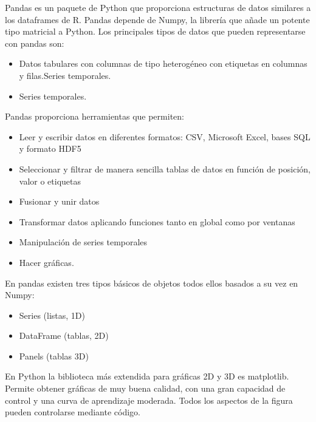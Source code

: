 \documentclass[preprint,12pt]{elsarticle}
\begin{document}
Pandas es un paquete de Python que proporciona estructuras de datos similares a los dataframes de R. Pandas depende de Numpy, la librería que añade un potente tipo matricial a Python. Los principales tipos de datos que pueden representarse con pandas son:
\begin{itemize}
\item Datos tabulares con columnas de tipo heterogéneo con etiquetas en columnas y filas.Series temporales.
\item Series temporales.\\
\end{itemize}
Pandas proporciona herramientas que permiten:
\begin{itemize}
\item Leer y escribir datos en diferentes formatos: CSV, Microsoft Excel, bases SQL y formato HDF5
\item Seleccionar y filtrar de manera sencilla tablas de datos en función de posición, valor o etiquetas
\item Fusionar y unir datos
\item Transformar datos aplicando funciones tanto en global como por ventanas
\item Manipulación de series temporales
\item Hacer gráficas.\\
\end{itemize}
En pandas existen tres tipos básicos de objetos todos ellos basados a su vez en Numpy:
\begin{itemize}
\item Series (listas, 1D)
\item DataFrame (tablas, 2D)
\item Panels (tablas 3D)\\
\end{itemize}
En Python la biblioteca más extendida para gráficas 2D y 3D es matplotlib. Permite obtener gráficas de muy buena calidad, con una gran capacidad de control y una curva de aprendizaje moderada. Todos los aspectos de la figura pueden controlarse mediante código.\\\\
\end{document}
